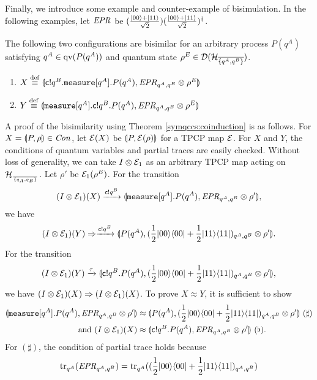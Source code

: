 Finally, we introduce some example and counter-example of bisimulation.
In the following examples, let $\mathit{EPR}$ be
$(\frac{|00\rangle+|11\rangle}{\sqrt{2}})
(\frac{|00\rangle+|11\rangle}{\sqrt{2}})^\dagger$.
\begin{ex}
 The following two configurations are bisimilar
for an arbitrary process $P(q^A)$ 
satisfying $q^A \in \mathrm{qv}(P(q^A))$ and quantum state $\rho^E \in
\mathcal{D}(\mathcal{H}_{\overline{\{q^A, q^B\}}})$.

 \begin{enumerate}
  \item $X \overset{\mathrm{def}}{\equiv} \llparenthesis 
	\mathsf{c}! q^B. {\tt measure}[q^A].P(q^A)
	, 
	\mathit{EPR}_{q^A, q^B} \otimes \rho^E
	 \rrparenthesis$
  \item $Y \overset{\mathrm{def}}{\equiv} \llparenthesis 
        {\tt measure}[q^A]. \mathsf{c}! q^B.P(q^A)
	, 
	\mathit{EPR}_{q^A, q^B} \otimes \rho^E
	 \rrparenthesis$
 \end{enumerate}
\end{ex}
 A proof of the bisimilarity using Theorem \ref{symqccs:coinduction} is
 as follows.
 For $X = \llparenthesis P, \rho \rrparenthesis \in \mathit{Con}$, let $\mathcal{E}(X)$ be $\llparenthesis P, \mathcal{E}(\rho) \rrparenthesis$
 for a TPCP map $\mathcal{E}$.
 For $X$ and $Y$, the conditions of quantum variables and
 partial traces are easily checked. Without loss of generality, 
we can take $I \otimes \mathcal{E}_1$ as an arbitrary
TPCP map acting on $\mathcal{H}_{\over{\{q_A, q_B\}}}$.
Let $\rho'$ be $\mathcal{E}_1(\rho^E)$.
For the transition
 \[
  (I \otimes \mathcal{E}_1)(X)
 \xrightarrow{\mathsf{c}! q^B} 
 \llparenthesis 
 {\tt measure}[q^A].P(q^A)
 , 
 \mathit{EPR}_{q^A, q^B} \otimes \rho'
  \rrparenthesis,
 \]
 we have
 \[
 (I \otimes \mathcal{E}_1)(Y)
 \Rightarrow \xrightarrow{\mathsf{c}! q^B} 
 \llparenthesis P(q^A), (\frac{1}{2}|00\rangle\langle 00| +
 \frac{1}{2}|11\rangle\langle 11|)_{q^A, q^B} \otimes \rho' \rrparenthesis.
 \]
 For the transition
 \[
 (I \otimes \mathcal{E}_1)(Y) \xrightarrow{\tau}
 \llparenthesis \mathsf{c}! q^B.P(q^A), (\frac{1}{2}|00\rangle\langle 00|+\frac{1}{2}|11\rangle\langle 11|)_{q^A, q^B}
 \otimes \rho' \rrparenthesis,
 \]
 we have $(I \otimes \mathcal{E}_1) (X) \Rightarrow 
(I \otimes \mathcal{E}_1) (X)$. To prove $X \approx Y$, it is sufficient to
show 
\begin{align*}
 \llparenthesis {\tt measure}[q^A].P(q^A), \mathit{EPR}_{q^A, q^B} \otimes \rho' \rrparenthesis
 &\approx
 \llparenthesis P(q^A), (\frac{1}{2}|00\rangle\langle 00| +
 \frac{1}{2}|11\rangle\langle 11|)_{q^A, q^B} \otimes \rho' \rrparenthesis~(\sharp)\\
 \mbox{ and }
 (I \otimes \mathcal{E}_1) (X)
 &\approx
 \llparenthesis \mathsf{c}! q^B.P(q^A), \mathit{EPR}_{q^A, q^B} \otimes \rho' \rrparenthesis~(\flat).
\end{align*}
 For $(\sharp)$, the condition of partial
 trace holds
 because
 \[
  {\rm tr}_{q^A}(\mathit{EPR}_{q^A,q^B}) = 
 {\rm tr}_{q^A}((\frac{1}{2}|00\rangle\langle 00| +
 \frac{1}{2}|11\rangle\langle 11|)_{q^A,q^B})
 \]
